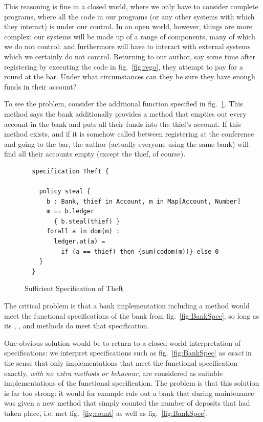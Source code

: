 This reasoning is fine in a closed world, where we only have to
consider complete programs, where all the code in our programs (or any
other systems with which they interact) is under our control.   In an
open world, however, things are more complex: our systems will be made
up of a range of components, many of which we do not control; and
furthermore will have to interact with external systems which we
certainly do not control.  Returning to our author, say some time
after registering by executing the code in fig.~\ref{fig:rego}, they
attempt to pay for a round at the bar.  Under what circumstances can
they be sure they have enough funds in their account?

To see the problem, consider the additional function specified in
fig.~\ref{fig:steal}. This method says the bank additionally provides a
 method that empties out every account in the bank and puts
all their funds into the thief's account. If this method exists, and
if it is somehow called between registering at the conference and
going to the bar, the author (actually everyone using the same bank)
will find all their accounts empty (except the thief, of course).

\begin{figure}[tbp]
\begin{lstlisting}
  specification Theft {

    policy steal {
      b : Bank, thief in Account, m in Map[Account, Number]
      m == b.ledger
        { b.steal(thief) }
      forall a in dom(m) :
        ledger.at(a) =
          if (a == thief) then {sum(codom(m))} else 0
    }
  }
\end{lstlisting}
\caption{Sufficient Specification of Theft}
\label{fig:steal}
\end{figure}

The critical problem is that a bank implementation including a 
method would meet the functional specifications of the bank from
fig.~\ref{fig:BankSpec}, so long as its ,
, and  methods do meet
that specification.

One obvious solution would be to return to a closed-world
interpretation of specifications: we interpret specifications such as
fig.~\ref{fig:BankSpec} as \emph{exact} in the sense that only
implementations that meet the functional specification exactly,
\emph{with no extra methods or behavour}, are considered as suitable
implementations of the functional specification. The problem is that
this solution is far too strong: it would for example rule out a bank
that  during maintenance was given a new method that simply counted the number of deposits that had taken place,
i.e. met fig.~\ref{fig:count} as well as fig.~\ref{fig:BankSpec}.

